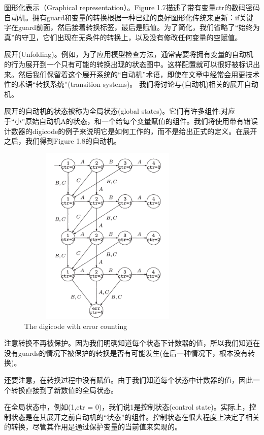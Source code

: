 \documentclass{book}
\begin{document}
    图形化表示（Graphical representation）。Figure 1.7描述了带有变量ctr的数码密码自动机。拥有guard和变量的转换根据一种已建的良好图形化传统来更新：if关键字在guard前面，然后接着转换标签，最后是赋值。为了简化，我们省略了“始终为真”的守卫，它们出现在无条件的转换上，以及没有修改任何变量的空赋值。
    
    展开(Unfolding)。例如，为了应用模型检查方法，通常需要将拥有变量的自动机的行为展开到一个只有可能的转换出现的状态图中。这样配置就可以很好被标识出来。然后我们保留着这个展开系统的“自动机”术语，即使在文章中经常会用更技术性的术语“转换系统”(transition systems)。 我们将讨论与(自动机)相关的展开自动机。
    
    展开的自动机的状态被称为全局状态(global states)。它们有许多组件:对应于“小”原始自动机A的状态，和一个给每个变量赋值的组件。我们将使用带有错误计数器的digicode的例子来说明它是如何工作的，而不是给出正式的定义。在展开之后，我们得到Figure 1.8的自动机。
    \begin{figure}
    \centering
    \includegraphics[height=3.4in,width=3.4in]{1_8.png}
    \caption{The digicode with error counting}
    \end{figure}

    注意转换不再被保护。因为我们明确知道每个状态下计数器的值，所以我们知道在没有guards的情况下被保护的转换是否有可能发生(在后一种情况下，根本没有转换)。
    
    还要注意，在转换过程中没有赋值。由于我们知道每个状态中计数器的值，因此一个转换直接到了新数值的全局状态。
    
    在全局状态中，例如(1,ctr = 0)，我们说1是控制状态(control state)。实际上，控制状态是在其展开之前自动机的“状态”的组件。控制状态在很大程度上决定了相关的转换，尽管其作用是通过保护变量的当前值来实现的。
\end{document}
